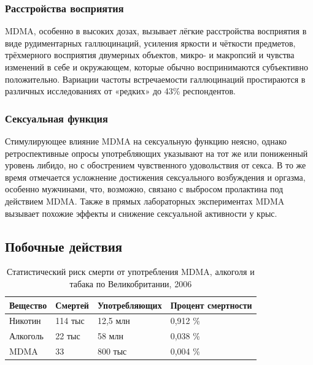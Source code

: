 \documentclass[a4paper,14pt,russian]{report}
\begin{document}
\subsubsection{Расстройства восприятия}
MDMA, особенно в высоких дозах, вызывает лёгкие расстройства восприятия в виде рудиментарных галлюцинаций, усиления яркости и чёткости предметов, трёхмерного восприятия двумерных объектов, микро- и макропсий и чувства изменений в себе и окружающем, которые обычно воспринимаются субъективно положительно. Вариации частоты встречаемости галлюцинаций простираются в различных исследованиях от «редких» до 43\% респондентов.

\subsubsection{Сексуальная функция}
Стимулирующее влияние MDMA на сексуальную функцию неясно, однако ретроспективные опросы употребляющих указывают на тот же или пониженный уровень либидо, но с обострением чувственного удовольствия от секса. В то же время отмечается усложнение достижения сексуального возбуждения и оргазма, особенно мужчинами, что, возможно, связано с выбросом пролактина под действием MDMA. Также в прямых лабораторных экспериментах MDMA вызывает похожие эффекты и снижение сексуальной активности у крыс.

\subsection{Побочные действия}

\begin{table}[!htb]
\centering
\caption{Статистический риск смерти от употребления MDMA, алкоголя и табака по Великобритании, 2006}
\label{table:deaths}
\begin{tabular}{|l|l|l|l|}
  \hline
  Вещество & Смертей & Употребляющих & Процент смертности \\
  \hline
  Никотин  & 114 тыс & 12,5 млн      & 0,912 \% \\
  Алкоголь & 22 тыс  & 58 млн        & 0,038 \% \\
  MDMA     & 33      & 800 тыс       & 0,004 \% \\
  \hline
\end{tabular}
\end{table}
\end{document}
